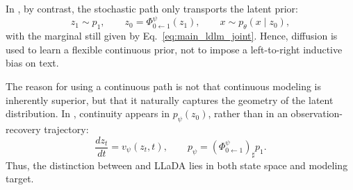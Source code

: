 In \method, by contrast, the stochastic path only transports the latent prior:
\begin{equation}
z_1\sim p_1,\qquad
z_0=\Phi^\psi_{0\leftarrow 1}(z_1),\qquad
x\sim p_\theta(x\mid z_0),
\label{eq:main_ldlm_process}
\end{equation}
with the marginal still given by Eq.~\eqref{eq:main_ldlm_joint}. Hence, diffusion is used to learn a flexible continuous prior, not to impose a left-to-right inductive bias on text.

The reason for using a continuous path is not that continuous modeling is inherently superior, but that it naturally captures the geometry of the latent distribution. In \method, continuity appears in \(p_\psi(z_0)\), rather than in an observation-recovery trajectory:
\begin{equation}
\frac{dz_t}{dt}=v_\psi(z_t,t),
\qquad
p_\psi=(\Phi^\psi_{0\leftarrow 1})_\sharp p_1.
\label{eq:main_why_continuous}
\end{equation}
Thus, the distinction between \method and LLaDA lies in both state space and modeling target.

